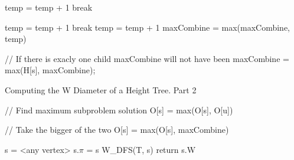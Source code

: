 \begin{algorithm}[h]{}
\begin{algorithmic}[1]
                        \State temp = temp + 1
                        \State break
                    \EndIf
                \EndFor
            \EndIf

                        \State temp = temp + 1
                        \State break
                    \EndIf
                \EndFor
            \EndIf
                \State temp = temp + 1
            \EndIf
            \State maxCombine = max(maxCombine, temp)
        \EndFor

    // If there is exacly one child maxCombine will not have been
    \State maxCombine = max(H[s], maxCombine);

    \EndFor

\end{algorithmic}
\end{algorithm}

\begin{algorithm}{}
\caption{Computing the W Diameter of a Height Tree. Part 2}
\begin{algorithmic}[1]

    \State // Find maximum subproblem solution
        \State O[s] = max(O[s], O[u])
    \EndFor

    \State // Take the bigger of the two
    \State O[s] = max(O[s], maxCombine)


    \State s = <any vertex>
    \State s.$\pi$ = s
    \State W\_DFS(T, s)
    \State return s.W
\EndFunction

\end{algorithmic}
\end{algorithm}






